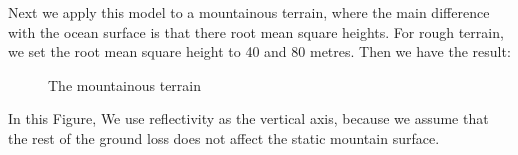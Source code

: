 \documentclass{mcmthesis}
\begin{document}
      Next we apply this model to a mountainous terrain, where the main difference with the ocean surface is that there root mean square heights. For rough terrain, we set the root mean square height to 40 and 80 metres. Then we have the result:

      \begin{figure}[!t]
      \centering
      \caption{ The mountainous terrain}
      \label{fig:mountainous}
      \end{figure}

      In this Figure, We use reflectivity as the vertical axis, because we assume that the rest of the ground loss does not affect the static mountain surface.
\end{document}
